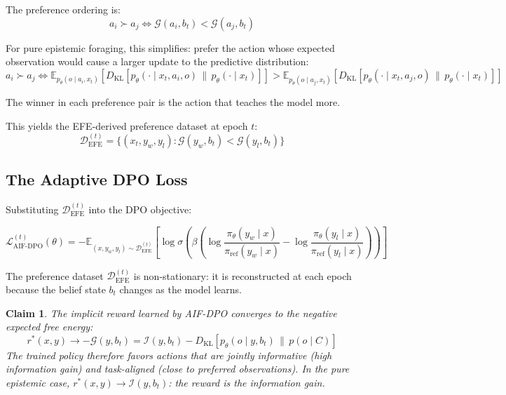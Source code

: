 \documentclass[11pt]{article}
\newtheorem{claim}{Claim}
\newcommand{\EFE}{\mathcal{G}}
\newcommand{\KL}[2]{D_{\mathrm{KL}}\!\left[#1 \,\|\, #2\right]}
\newcommand{\Esub}[2]{\mathbb{E}_{#1}\!\left[#2\right]}
\begin{document}
The preference ordering is:
\begin{equation}
\label{eq:pref-ordering}
a_i \succ a_j \iff \EFE(a_i, b_t) < \EFE(a_j, b_t)
\end{equation}

For pure epistemic foraging, this simplifies: prefer the action whose expected observation would cause a larger update to the predictive distribution:
\begin{equation}
\label{eq:epistemic-ordering}
a_i \succ a_j \iff \Esub{p_\theta(o \mid a_i, x_t)}{\KL{p_\theta(\cdot \mid x_t, a_i, o)}{p_\theta(\cdot \mid x_t)}} > \Esub{p_\theta(o \mid a_j, x_t)}{\KL{p_\theta(\cdot \mid x_t, a_j, o)}{p_\theta(\cdot \mid x_t)}}
\end{equation}

The winner in each preference pair is the action that teaches the model more.

This yields the EFE-derived preference dataset at epoch $t$:
\begin{equation}
\label{eq:efe-dataset}
\mathcal{D}_{\mathrm{EFE}}^{(t)} = \big\{(x_t, y_w, y_l) : \EFE(y_w, b_t) < \EFE(y_l, b_t)\big\}
\end{equation}


\subsection{The Adaptive DPO Loss}

Substituting $\mathcal{D}_{\mathrm{EFE}}^{(t)}$ into the DPO objective:

\begin{equation}
\label{eq:aif-dpo}
\mathcal{L}_{\mathrm{AIF\text{-}DPO}}^{(t)}(\theta) = -\mathbb{E}_{(x, y_w, y_l) \sim \mathcal{D}_{\mathrm{EFE}}^{(t)}} \left[ \log \sigma \left( \beta \left( \log \frac{\pi_\theta(y_w \mid x)}{\pi_{\mathrm{ref}}(y_w \mid x)} - \log \frac{\pi_\theta(y_l \mid x)}{\pi_{\mathrm{ref}}(y_l \mid x)} \right) \right) \right]
\end{equation}

The preference dataset $\mathcal{D}_{\mathrm{EFE}}^{(t)}$ is non-stationary: it is reconstructed at each epoch because the belief state $b_t$ changes as the model learns.

\begin{claim}
\label{claim:implicit-reward}
The implicit reward learned by AIF-DPO converges to the negative expected free energy:
\begin{equation}
\label{eq:implicit-efe}
r^*(x, y) \to -\EFE(y, b_t) = \mathcal{I}(y, b_t) - \KL{p_\theta(o \mid y, b_t)}{p(o \mid C)}
\end{equation}
The trained policy therefore favors actions that are jointly informative (high information gain) and task-aligned (close to preferred observations). In the pure epistemic case, $r^*(x,y) \to \mathcal{I}(y, b_t)$: the reward \emph{is} the information gain.
\end{claim}
\end{document}
